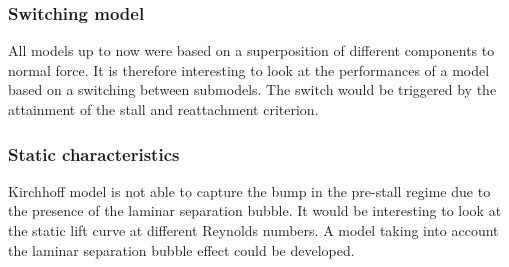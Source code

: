 
\subsubsection{Switching model}

All models up to now were based on a superposition of different components to normal force. It is therefore interesting to look at the performances of a model based on a switching between submodels. The switch would be triggered by the attainment of the stall and reattachment criterion.

\subsubsection{Static characteristics}

Kirchhoff model is not able to capture the bump in the pre-stall regime due to the presence of the laminar separation bubble.
It would be interesting to look at the static lift curve at different Reynolds numbers. A model taking into account the laminar separation bubble effect could be developed. 